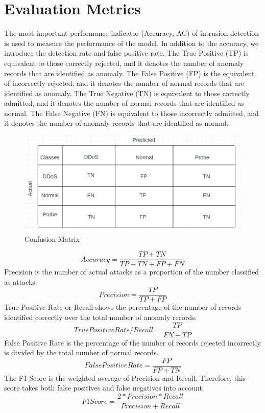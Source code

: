 \section{Evaluation Metrics}
\vspace{-18pt}
The most important performance indicator (Accuracy, AC) of intrusion detection is used to measure the performance of the model. In addition to the accuracy, we introduce the detection rate and false positive rate. The True Positive (TP) is equivalent to those correctly rejected, and it denotes the number of anomaly records that are identified as anomaly. The False Positive (FP) is the equivalent of incorrectly rejected, and it denotes the number of normal records that are identified as anomaly. The True Negative (TN) is equivalent to those correctly admitted, and it denotes the number of normal records that are identified as normal. The False Negative (FN) is equivalent to those incorrectly admitted, and it denotes the number of anomaly records that are identified as normal.
\begin{figure}[tbh] %
	\begin{center}
		\includegraphics[width=6in]{images/confMat.png} 
		\caption{Confusion Matrix} %
		\label{Confusion Matrix} %
	\end{center}
\end{figure}
\begin{equation}
	Accuracy = \frac{TP + TN}{TP + TN + FP + FN}
\end{equation} 
Precision is the number of actual attacks as a proportion of the number classified as attacks.
\begin{equation}
	Precision = \frac{TP}{TP + FP} 
\end{equation}
True Positive Rate or Recall shows the percentage of the number of records identified correctly over the total number of anomaly records.
\begin{equation}
	True Positive Rate/ Recall = \frac{TP}{FN + TP}
\end{equation}
False Positive Rate is the percentage of the number of records rejected incorrectly is divided by the total number of normal records.
\begin{equation}
	False Positive Rate = \frac{FP}{FP + TN}
\end{equation}
The F1 Score is the weighted average of Precision and Recall. Therefore, this score takes both false positives and false negatives into account.
\begin{equation}
	F1 Score = \frac{2 * Precision * Recall}{Precision + Recall}
\end{equation}
